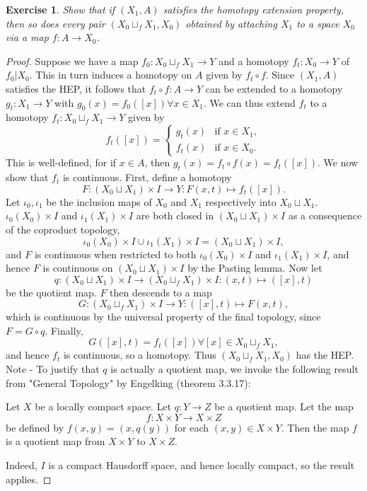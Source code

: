 \documentclass{article}
\newtheorem{exercise}{Exercise}[subsection]
\begin{document}
\begin{exercise}
Show that if $(X_1,A)$ satisfies the homotopy extension property, then so does every pair $(X_0\sqcup_fX_1,X_0)$ obtained by attaching $X_1$ to a space $X_0$ via a map $f:A\to X_0$.
\end{exercise}
\begin{proof}
Suppose we have a map $f_0:X_0\sqcup_fX_1\to Y$ and a homotopy $f_t:X_0\to Y$ of $f_0|X_0$. This in turn induces a homotopy on $A$ given by $f_t\circ f$. Since $(X_1,A)$ satisfies the HEP, it follows that $f_t\circ f:A\to Y$ can be extended to a homotopy $g_t:X_1\to Y$ with $g_0(x)=f_0([x])\forall x\in X_1$. We can thus extend $f_t$ to a homotopy $f_t:X_0\sqcup_fX_1\to Y$ given by \[f_t([x])=\begin{cases}
    g_t(x)&\text{if }x\in X_1,\\
    f_t(x)&\text{if }x\in X_0.
\end{cases}\]This is well-defined, for if $x\in A$, then $g_t(x)=f_t\circ f(x)=f_t([x])$. We now show that $f_t$ is continuous. First, define a homotopy \[F:(X_0\sqcup X_1)\times I\to Y:F(x,t)\mapsto f_t([x]).\] Let $\iota_0,\iota_1$ be the inclusion maps of $X_0$ and $X_1$ respectively into $X_0\sqcup X_1$. $\iota_0(X_0)\times I$ and $\iota_1(X_1)\times I$ are both closed in $(X_0\sqcup X_1)\times I$ as a consequence of the coproduct topology, \[\iota_0(X_0)\times I\cup \iota_1(X_1)\times I=(X_0\sqcup X_1)\times I,\] and $F$ is continuous when restricted to both $\iota_0(X_0)\times I$ and $\iota_1(X_1)\times I$, and hence $F$ is continuous on $(X_0\sqcup X_1)\times I$ by the Pasting lemma. Now let \[q:(X_0\sqcup X_1)\times I\to (X_0\sqcup_fX_1)\times I:(x,t)\mapsto([x],t)\] be the quotient map. $F$ then descends to a map \[G:(X_0\sqcup_fX_1)\times I\to Y:([x],t)\mapsto F(x,t),\] which is continuous by the universal property of the final topology, since $F=G\circ q$. Finally, \[G([x],t)=f_t([x])\forall[x]\in X_0\sqcup_fX_1,\] and hence $f_t$ is continuous, so a homotopy. Thus $(X_0\sqcup_fX_1,X_0)$ has the HEP. 
\newline Note - To justify that $q$ is actually a quotient map, we invoke the following result from "General Topology" by Engelking (theorem 3.3.17):\newline

\noindent Let $X$  be a locally compact space. Let $q:Y\to Z$ be a quotient map. Let the map \[f:X\times Y\to X\times Z\] be defined by $f(x,y)=(x,q(y))$ for each $(x,y)\in X\times Y$. Then the map $f$ is a quotient map from $X\times Y$ to $X\times Z$.

Indeed, $I$ is a compact Hausdorff space, and hence locally compact, so the result applies.
\end{proof}
\end{document}
